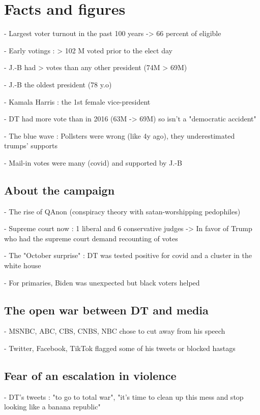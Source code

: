 \documentclass[10pt]{article}
\begin{document}
\section*{Facts and figures}

- Largest voter turnout in the past 100 years -> 66 percent of eligible

- Early votings : > 102 M voted prior to the elect day

- J.-B had > votes than any other president (74M > 69M)

- J.-B the oldest president (78 y.o)

- Kamala Harris : the 1st female vice-president

- DT had more vote than in 2016 (63M -> 69M) so isn't a "democratic accident"

- The blue wave : Pollsters were wrong (like 4y ago), they underestimated 
trumps' supports

- Mail-in votes were many (covid) and supported by J.-B

\subsection*{About the campaign}

- The rise of QAnon (conspiracy theory with satan-worshipping pedophiles)

- Supreme court now : 1 liberal and 6 conservative judges -> In favor of Trump
 who had the supreme court demand recounting of votes

- The "October surprise" : DT was tested positive for covid and a cluster in 
the white house

- For primaries, Biden was unexpected but black voters helped

\subsection*{The open war between DT and media}

- MSNBC, ABC, CBS, CNBS, NBC chose to cut away from his speech

- Twitter, Facebook, TikTok flagged some of his tweets or blocked hastags

\subsection*{Fear of an escalation in violence}

- DT's tweets : "to go to total war", "it's time to clean up this mess and 
stop looking like a banana republic"
\end{document}
